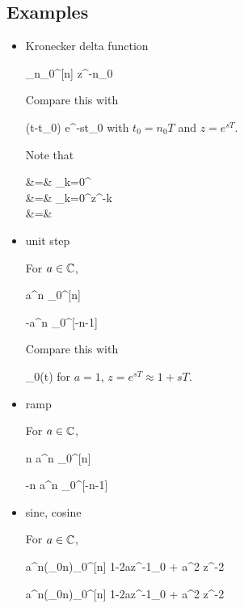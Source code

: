 \subsection{Examples}
\begin{itemize}

\item Kronecker delta function

\beq
\delta_{n_0}^{[n]}
\maparrow{\calz}
z^{-n_0}
\eeq

Compare this with

\beq
\delta(t-t_0)
\maparrow{\call} e^{-st_0}
\eeq
with $t_0=n_0T$
and $z=e^{sT}$.

Note that

\beqa
\calz[\heavy^{[n]}_0]
&=&
\sum_{k=0}^\infty\calz[\delta^{[n]}_k]
\\
&=&
\sum_{k=0}^\infty z^{-k}
\\
&=&
\eeqa


\item unit step

For $a\in{ \mathbb{C}}$,

\beq
a^n \heavy_0^{[n]}
\maparrow{\calz}
\quad {}
\eeq


\beq
-a^n \heavy_0^{[-n-1]}
\maparrow{\calz}
\quad {}
\eeq

Compare this with

\beq
\heavy_0(t)
\maparrow{\call}
\quad {}
\eeq
for $a=1$, $z=e^{sT}\approx 1 + sT$.


\item ramp

For $a\in{ \mathbb{C}}$,

\beq
n a^n \heavy_0^{[n]}
\maparrow{\calz}
\quad {}
\eeq


\beq
-n a^n \heavy_0^{[-n-1]}
\maparrow{\calz}
\quad {}
\eeq

\item sine, cosine

For $a\in{ \mathbb{C}}$,

\beq
a^n\sin(\omega_0n)\heavy_0^{[n]}
\maparrow{\calz}
{1-2az^{-1}\cos\omega_0 + a^2 z^{-2}}
\eeq

\beq
a^n\cos(\omega_0n)\heavy_0^{[n]}
\maparrow{\calz}
{1-2az^{-1}\cos\omega_0 + a^2 z^{-2}}
\eeq
\end{itemize}

